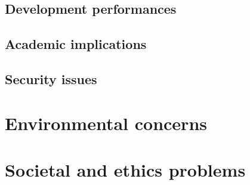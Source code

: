 \documentclass[11pt]{article}
\begin{document}
\subsection{Development performances}\label{subsec:developement}
\subsection{Academic implications}\label{subsec:academic}
\subsection{Security issues}\label{subnsec:security}
\section{Environmental concerns}\label{sec:environement}
\section{Societal and ethics problems}\label{sec:social}

\newpage
\ifdefined\HCode
\else
{}
\fi
\nocite{*}
\printbibliography
\end{document}
